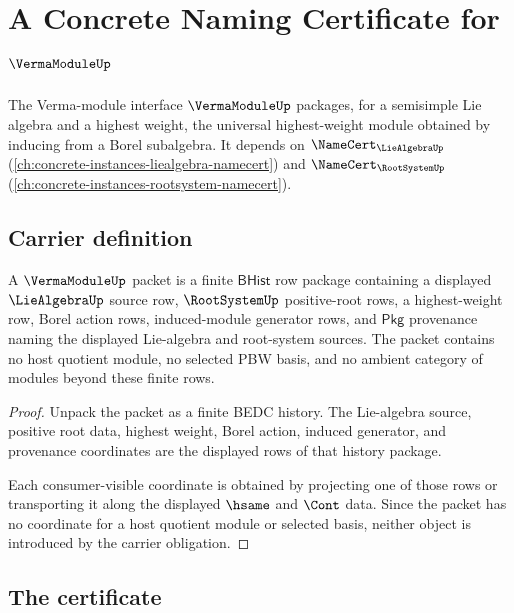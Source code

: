 \chapter{A Concrete Naming Certificate for $\VermaModuleUp$}
\label{ch:concrete-instances-vermamodule-namecert}

The Verma-module interface $\VermaModuleUp$ packages, for a semisimple Lie algebra and a highest weight, the universal highest-weight module obtained by inducing from a Borel subalgebra. It depends on $\NameCert_{\LieAlgebraUp}$ (\autoref{ch:concrete-instances-liealgebra-namecert}) and $\NameCert_{\RootSystemUp}$ (\autoref{ch:concrete-instances-rootsystem-namecert}).

\section{Carrier definition}
\label{sec:vermamodule-carrier}

\begin{theorem}
\label{thm:vermamodule-carrier-obligation}
A $\VermaModuleUp$ packet is a finite $\mathsf{BHist}$ row package containing a
displayed $\LieAlgebraUp$ source row, $\RootSystemUp$ positive-root rows, a
highest-weight row, Borel action rows, induced-module generator rows, and
$\mathsf{Pkg}$ provenance naming the displayed Lie-algebra and root-system
sources. The packet contains no host quotient module, no selected PBW basis,
and no ambient category of modules beyond these finite rows.
\end{theorem}
\begin{proof}
Unpack the packet as a finite BEDC history. The Lie-algebra source, positive
root data, highest weight, Borel action, induced generator, and provenance
coordinates are the displayed rows of that history package.

Each consumer-visible coordinate is obtained by projecting one of those rows or
transporting it along the displayed $\hsame$ and $\Cont$ data. Since the packet
has no coordinate for a host quotient module or selected basis, neither object
is introduced by the carrier obligation.
\end{proof}

\section{The certificate}
\label{sec:vermamodule-certificate}

